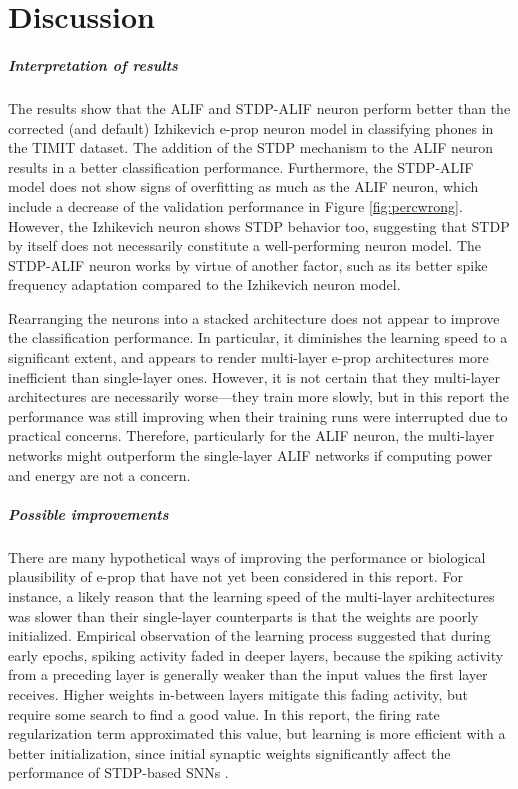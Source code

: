\chapter{Discussion}\label{ch:discussion}

\paragraph{Interpretation of results}

The results show that the ALIF and STDP-ALIF neuron perform better than the corrected (and default) Izhikevich e-prop neuron model in classifying phones in the TIMIT dataset.
The addition of the STDP mechanism to the ALIF neuron results in a better classification performance.
Furthermore, the STDP-ALIF model does not show signs of overfitting as much as the ALIF neuron, which include a decrease of the validation performance in Figure \ref{fig:percwrong}.
However, the Izhikevich neuron shows STDP behavior too, suggesting that STDP by itself does not necessarily constitute a well-performing neuron model.
The STDP-ALIF neuron works by virtue of another factor, such as its better spike frequency adaptation compared to the Izhikevich neuron model.

Rearranging the neurons into a stacked architecture does not appear to improve the classification performance.
In particular, it diminishes the learning speed to a significant extent, and appears to render multi-layer e-prop architectures more inefficient than single-layer ones.
However, it is not certain that they multi-layer architectures are necessarily worse---they train more slowly, but in this report the performance was still improving when their training runs were interrupted due to practical concerns.
Therefore, particularly for the ALIF neuron, the multi-layer networks might outperform the single-layer ALIF networks if computing power and energy are not a concern.

\paragraph{Possible improvements}
    There are many hypothetical ways of improving the performance or biological plausibility of e-prop that have not yet been considered in this report.
    For instance, a likely reason that the learning speed of the multi-layer architectures was slower than their single-layer counterparts is that the weights are poorly initialized.
    Empirical observation of the learning process suggested that during early epochs, spiking activity faded in deeper layers, because the spiking activity from a preceding layer is generally weaker than the input values the first layer receives.
    Higher weights in-between layers mitigate this fading activity, but require some search to find a good value.
    In this report, the firing rate regularization term approximated this value, but learning is more efficient with a better initialization, since initial synaptic weights significantly affect the performance of STDP-based SNNs \citep{kim2020initial}.

